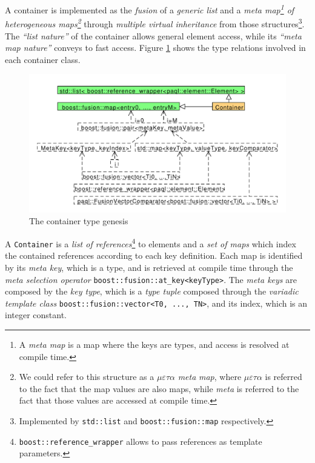 \documentclass[10pt]{article}  %
\begin{document}
        A container is implemented as the \emph{fusion} of a \emph{generic list} and a \emph{meta map\footnote{
        A \emph{meta map} is a map where the keys are types, and access is resolved at compile time.} of heterogeneous maps\footnote{We could refer
        to this structure as a $\mu\varepsilon\tau\alpha$ \emph{meta} \emph{map}, where $\mu\varepsilon\tau\alpha$ is referred to the fact that the map values are also maps, while \emph{meta} is referred to the fact that
        those values are accessed at compile time.}}
        through \emph{multiple virtual inheritance}
        from those structures\footnote{Implemented by \texttt{std::list} and \texttt{boost::fusion::map} respectively.}.
        The \emph{``list nature''} of the container allows general element access, while its \emph{``meta map nature''}
        conveys to fast access. Figure \ref{fig:containerUML} shows the type relations involved in each container class.
        \begin{figure}[htbp]
            \centering
            \includegraphics[scale=0.5]{Container.pdf}
            \caption{The container type genesis}\label{fig:containerUML}
        \end{figure}
        A \texttt{Container} is a \emph{list of references}\footnote{\texttt{boost::reference_wrapper} allows to pass references as template
        parameters.} to elements and a \emph{set of maps} which index the contained references
        according to each key definition. Each map is identified by its \emph{meta key}, which is a type, and is
        retrieved at compile time through the \emph{meta selection operator} \texttt{boost::fusion::at_key<keyType>}.
        The \emph{meta keys} are composed by the \emph{key type}, which is a \emph{type tuple} composed through the \emph{variadic
        template class} \texttt{boost::fusion::vector<T0, ..., TN>}, and its index, which is an integer constant.
\end{document}
